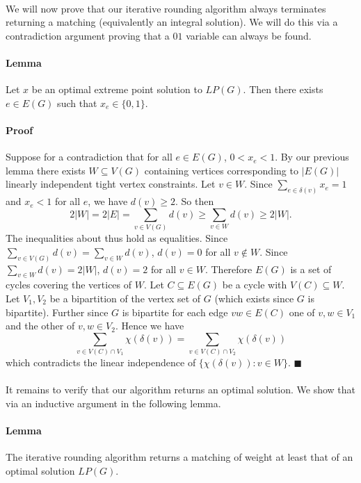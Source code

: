 \paragraph{} We will now prove that our iterative rounding algorithm always terminates returning a matching (equivalently an integral solution). We will do this via a contradiction argument proving that a $01$ variable can always be found.
\paragraph{Lemma} Let $x$ be an optimal extreme point solution to $LP(G)$. Then there exists $e \in E(G)$ such that $x_e \in \{0,1\}$.
\paragraph{Proof}
Suppose for a contradiction that for all $e\in E(G)$, $0 < x_e < 1$. By our previous lemma there exists $W \subseteq V(G)$ containing vertices corresponding to $|E(G)|$ linearly independent tight vertex constraints. Let $v \in W$. Since $\sum_{e\in \delta(v)} x_e = 1$ and $x_e < 1$ for all $e$, we have $d(v) \geq 2$. So then
$$2|W| = 2|E| = \sum_{v \in V(G)} d(v) \geq \sum_{v\in W} d(v) \geq 2|W|.$$
The inequalities about thus hold as equalities. Since $\sum_{v\in V(G)} d(v) = \sum_{v \in W} d(v)$, $d(v) = 0$ for all $v \not\in W$. Since $\sum_{v \in W} d(v) = 2|W|$, $d(v) = 2$ for all $v \in W$. Therefore $E(G)$ is a set of cycles covering the vertices of $W$. Let $C \subseteq E(G)$ be a cycle with $V(C) \subseteq W$. Let $V_1, V_2$ be a bipartition of the vertex set of $G$ (which exists since $G$ is bipartite). Further since $G$ is bipartite for each edge $vw \in E(C)$ one of $v,w \in V_1$ and the other of $v,w \in V_2$. Hence we have
$$\sum_{v \in V(C) \cap V_1} \chi(\delta(v)) = \sum_{v\in V(C) \cap V_2} \chi(\delta(v))$$
which contradicts the linear independence of $\{\chi(\delta(v)) : v \in W\}$. $\blacksquare$
\paragraph{}
It remains to verify that our algorithm returns an optimal solution. We show that via an inductive argument in the following lemma.
\paragraph{Lemma}
The iterative rounding algorithm returns a matching of weight at least that of an optimal solution $LP(G)$.
